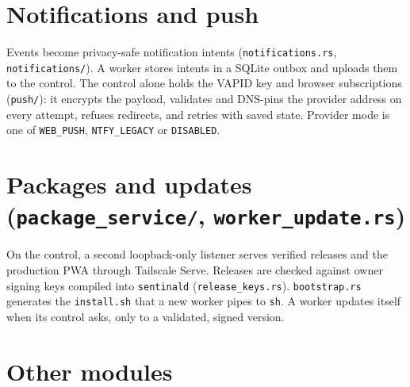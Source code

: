 \section{\texorpdfstring{Notifications and push}{Notifications and push}}

Events become privacy-safe notification intents (\texttt{notifications.\allowbreak{}rs}, \texttt{notifications/\allowbreak{}}). A worker stores intents in a SQLite outbox and uploads them to the control. The control alone holds the VAPID key and browser subscriptions (\texttt{push/\allowbreak{}}): it encrypts the payload, validates and DNS-pins the provider address on every attempt, refuses redirects, and retries with saved state. Provider mode is one of \texttt{WEB\_\allowbreak{}PUSH}, \texttt{NTFY\_\allowbreak{}LEGACY} or \texttt{DISABLED}.

\section{\texorpdfstring{Packages and updates (\texttt{package\_\allowbreak{}service/\allowbreak{}}, \texttt{worker\_\allowbreak{}update.\allowbreak{}rs})}{Packages and updates (package\_service/, worker\_update.rs)}}

On the control, a second loopback-only listener serves verified releases and the production PWA through Tailscale Serve. Releases are checked against owner signing keys compiled into \texttt{sentinald} (\texttt{release\_\allowbreak{}keys.\allowbreak{}rs}). \texttt{bootstrap.\allowbreak{}rs} generates the \texttt{install.\allowbreak{}sh} that a new worker pipes to \texttt{sh}. A worker updates itself when its control asks, only to a validated, signed version.

\section{\texorpdfstring{Other modules}{Other modules}}

